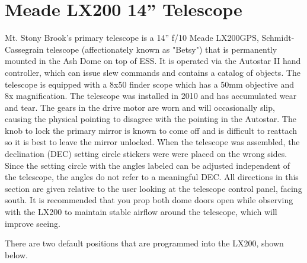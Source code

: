 \documentclass[12pt,titlepage]{article}
\begin{document}
\section{Meade LX200 14'' Telescope}
Mt. Stony Brook's primary telescope is a 14'' f/10 Meade LX200GPS, Schmidt-Cassegrain telescope (affectionately known as "Betsy") that is permanently mounted in the Ash Dome on top of ESS.
It is operated via the Autostar II hand controller, which can issue slew commands and contains a catalog of objects.
The telescope is equipped with a 8x50 finder scope which has a 50mm objective and 8x magnification.
The telescope was installed in 2010 and has accumulated wear and tear.
The gears in the drive motor are worn and will occasionally slip, causing the physical pointing to disagree with the pointing in the Autostar.
The knob to lock the primary mirror is known to come off and is difficult to reattach so it is best to leave the mirror unlocked.
When the telescope was assembled, the declination (DEC) setting circle stickers were were placed on the wrong sides. Since the setting circle with the angles labeled can be adjusted independent of the telescope, the angles do not refer to a meaningful DEC.
All directions in this section are given relative to the user looking at the telescope control panel, facing south.
It is recommended that you prop both dome doors open while observing with the LX200 to maintain stable airflow around the telescope, which will improve seeing.
\par There are two default positions that are programmed into the LX200, shown below.
\end{document}
